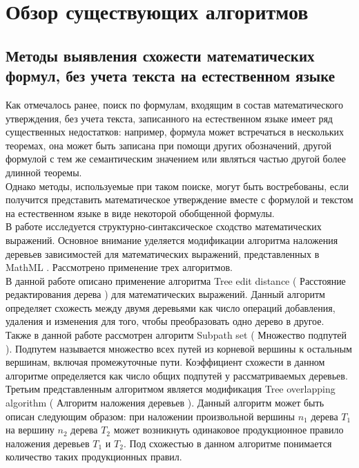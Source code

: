 \documentclass[12pt]{article}
\begin{document}
\newpage
\section{Обзор существующих алгоритмов}
\subsection{Методы выявления схожести математических формул, без учета текста на естественном языке}
Как отмечалось ранее, поиск по формулам, входящим в состав математического утверждения, без учета текста, записанного на естественном языке имеет ряд существенных недостатков: например, формула может встречаться в нескольких теоремах, она может быть записана при помощи других обозначений, другой формулой с тем же семантическим значением или являться частью другой более длинной теоремы. \\

Однако методы, используемые при таком поиске, могут быть востребованы, если получится представить математическое утверждение вместе с формулой  и текстом на естественном языке в виде некоторой обобщенной формулы.  \\

В работе \cite{Pyshkin} исследуется структурно-синтаксическое сходство математических выражений. Основное внимание уделяется модификации алгоритма наложения деревьев зависимостей для математических выражений, представленных в MathML . Рассмотрено применение трех алгоритмов. \\

В данной работе описано применение алгоритма Tree edit distance ( Расстояние редактирования дерева ) для математических выражений. Данный алгоритм определяет схожесть между двумя деревьями как число операций добавления, удаления и изменения для того, чтобы преобразовать одно дерево в другое. \\

Также в данной работе рассмотрен алгоритм Subpath set ( Множество подпутей ). Подпутем называется множество всех путей из корневой вершины к остальным вершинам, включая промежуточные пути. Коэффициент схожести в данном алгоритме определяется как число общих подпутей у рассматриваемых деревьев. \\

Третьим представленным алгоритмом является  модификация Tree overlapping algorithm ( Алгоритм наложения деревьев ). Данный алгоритм может быть описан следующим образом: при наложении произвольной вершины $n_1$ дерева $T_1$  на вершину $n_2$ дерева $T_2$ может возникнуть одинаковое продукционное правило наложения деревьев $T_1$ и $T_2$. Под схожестью в данном алгоритме понимается количество таких продукционных правил. \\
\end{document}
